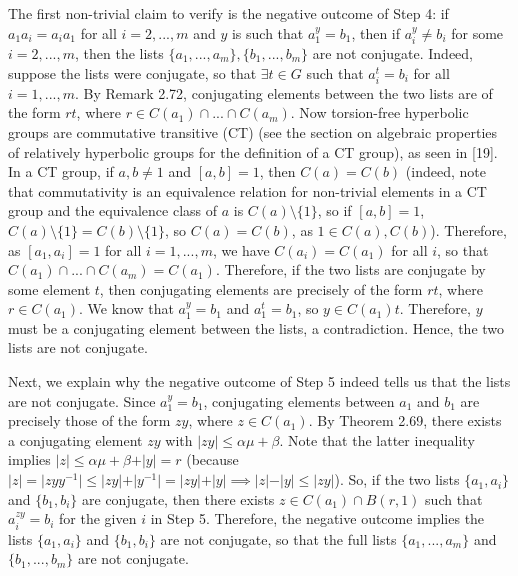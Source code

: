 \documentclass[12pt]{article}
\newcommand{\vs}{\vskip10pt}
\begin{document}
	The first non-trivial claim to verify is the negative outcome of Step 4: if $a_1 a_i = a_i a_1$ for all $i = 2,...,m$ and $y$ is such that $a_1^y = b_1$, then if $a_i^y \neq b_i$ for some $i = 2,...,m$, then the lists $\{a_1,...,a_m\}, \{b_1,...,b_m\}$ are not conjugate. Indeed, suppose the lists were conjugate, so that $\exists t \in G$ such that $a_i^t = b_i$ for all $i = 1,...,m$. By Remark 2.72, conjugating elements between the two lists are of the form $rt$, where $r \in C(a_1) \cap ... \cap C(a_m)$. Now torsion-free hyperbolic groups are commutative transitive (CT) (see the section on algebraic properties of relatively hyperbolic groups for the definition of a CT group), as seen in [19]. In a CT group, if $a,b \neq 1$ and $[a,b] = 1$, then $C(a) = C(b)$ (indeed, note that commutativity is an equivalence relation for non-trivial elements in a CT group and the equivalence class of $a$ is $C(a) \setminus \{1\}$, so if $[a,b] = 1$, $C(a) \setminus \{1\} = C(b) \setminus \{1\}$, so $C(a) = C(b)$, as $1 \in C(a), C(b)$). Therefore, as $[a_1, a_i] = 1$ for all $i = 1,...,m$, we have $C(a_i) = C(a_1)$ for all $i$, so that $ C(a_1) \cap ... \cap C(a_m) = C(a_1)$. Therefore, if the two lists are conjugate by some element $t$, then conjugating elements are precisely of the form $rt$, where $r \in C(a_1)$. We know that $a_1^y = b_1$ and $a_1^t = b_1$, so $y \in C(a_1)t$. Therefore, $y$ must be a conjugating element between the lists, a contradiction. Hence, the two lists are not conjugate. 
	
	\vs 
	
	Next, we explain why the negative outcome of Step 5 indeed tells us that the lists are not conjugate. Since $a_1^y = b_1$, conjugating elements between $a_1$ and $b_1$ are precisely those of the form $zy$, where $z \in C(a_1)$. By Theorem 2.69, there exists a conjugating element $zy$ with $\vert zy \vert \leq \alpha \mu + \beta$. Note that the latter inequality implies $\vert z \vert \leq \alpha \mu + \beta + \vert y \vert = r$ (because $\vert z \vert = \vert zyy^{-1} \vert \leq \vert zy \vert + \vert y^{-1} \vert  =  \vert zy \vert + \vert y \vert \implies \vert z \vert - \vert y \vert \leq \vert zy \vert $). So, if the two lists $\{a_1, a_i\}$ and $\{b_1, b_i\}$ are conjugate, then there exists $z \in C(a_1) \cap B(r,1)$ such that $a_i^{zy} = b_i$ for the given $i$ in Step 5. Therefore, the negative outcome implies the lists $\{a_1, a_i\}$ and $\{b_1, b_i\}$ are not conjugate, so that the full lists $\{a_1,...,a_m\}$ and $\{b_1,...,b_m\}$ are not conjugate. 
	
\end{document}
